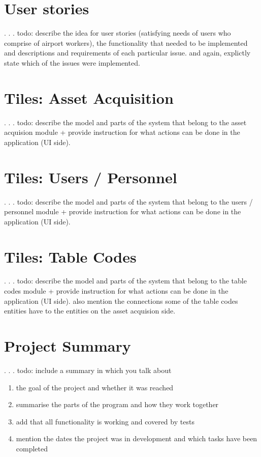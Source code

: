 \documentclass[a4paper, 12pt, final]{hitec}
\begin{document}
  \section{User stories}\label{sec:03}
  .
  .
  .
  todo: describe the idea for user stories (satisfying needs of users
  who comprise of airport workers), the functionality that needed to be
  implemented and descriptions and requirements of each particular issue.
  and again, explictly state which of the issues were implemented.
  \clearpage

  \section{Tiles: Asset Acquisition}\label{sec:04}
  .
  .
  .
  todo: describe the model and parts of the system that belong
  to the asset acquision module + provide instruction for what
  actions can be done in the application (UI side).
  \clearpage

  \section{Tiles: Users / Personnel}\label{sec:05}
  .
  .
  .
  todo: describe the model and parts of the system that belong
  to the users / personnel module + provide instruction for what
  actions can be done in the application (UI side).
  \clearpage

  \section{Tiles: Table Codes}\label{sec:06}
  .
  .
  .
  todo: describe the model and parts of the system that belong
  to the table codes module + provide instruction for what
  actions can be done in the application (UI side). also mention
  the connections some of the table codes entities have to the
  entities on the asset acquision side.
  \clearpage

  \section{Project Summary}\label{sec:07}
  .
  .
  .
  todo:
  include a summary in which you talk about
  \begin{enumerate}
    \item the goal of the project and whether it was reached
    \item summarise the parts of the program and how they work together
    \item add that all functionality is working and covered by tests
    \item mention the dates the project was in development and which tasks have been completed
  \end{enumerate}
  \clearpage
\end{document}
